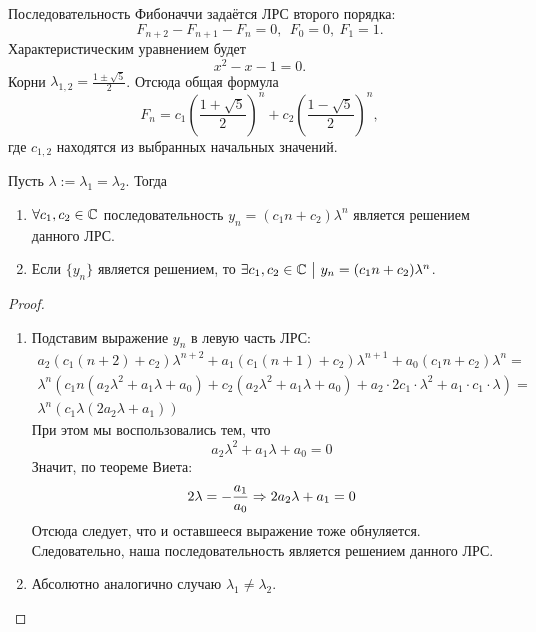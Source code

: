 \begin{enumerate}
	\begin{example}
		Последовательность Фибоначчи задаётся ЛРС второго порядка:
		\[
		F_{n + 2} - F_{n + 1} - F_n = 0,\ \ F_0 = 0,\ F_1 = 1.
		\]
		Характеристическим уравнением будет
		\[
		x^2 - x - 1 = 0.
		\]
		Корни $\lambda_{1, 2} = \frac{1 \pm \sqrt{5}}{2}$. Отсюда общая формула
		\[
		F_n = c_1\left(\frac{1 + \sqrt{5}}{2}\right)^n + c_2\left(\frac{1 - \sqrt{5}}{2}\right)^n,
		\]
		где $c_{1, 2}$ находятся из выбранных начальных значений.
	\end{example}

	\begin{theorem}
		Пусть $\lambda := \lambda_1 = \lambda_2$. Тогда
		\begin{enumerate}
			\item $\forall c_1, c_2 \in \mathbb{C}$ последовательность $y_n = (c_1n + c_2)\lambda^n$ является решением данного ЛРС.
			
			\item Если $\{y_n\}$ является решением, то $\exists c_1, c_2 \in \mathbb{C} \ \big|\  y_n = (c_1n + c_2)\lambda^n$.
		\end{enumerate}
	\end{theorem}
	
	\begin{proof}~
		\begin{enumerate}
			\item Подставим выражение $y_n$ в левую часть ЛРС:
			\begin{multline*}
				a_2(c_1(n + 2) + c_2)\lambda^{n + 2} + a_1(c_1(n + 1) + c_2)\lambda^{n + 1} + a_0(c_1 n + c_2)\lambda^n =
				\\
				\lambda^n\left(c_1 n(a_2\lambda^2 + a_1\lambda + a_0) + c_2(a_2\lambda^2 + a_1\lambda + a_0) + a_2 \cdot 2c_1 \cdot \lambda^2 + a_1 \cdot c_1 \cdot \lambda\right) =
				\\
				\lambda^n\left(c_1\lambda(2a_2 \lambda + a_1)\right)
			\end{multline*}
			При этом мы воспользовались тем, что
			\[
				a_2\lambda^2 + a_1\lambda + a_0 = 0
			\]
			Значит, по теореме Виета:
			\[
				2\lambda = -\frac{a_1}{a_0} \Rightarrow 2a_2\lambda + a_1 = 0
			\]
			Отсюда следует, что и оставшееся выражение тоже обнуляется. Следовательно, наша последовательность является решением данного ЛРС.
			
			\item Абсолютно аналогично случаю $\lambda_1 \neq \lambda_2$.
		\end{enumerate}
	\end{proof}


\end{enumerate}
